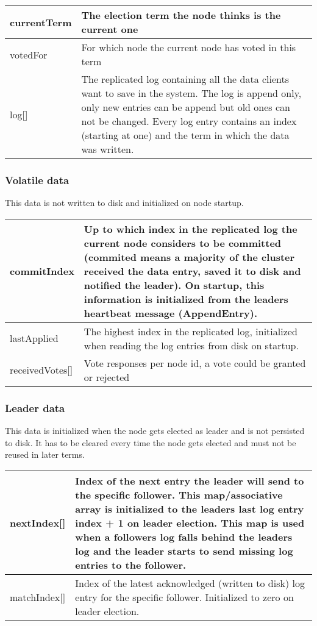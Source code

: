 \begin{tabular}{ | l | p{13.7cm} | }
\hline
currentTerm & The election term the node thinks is the current one \\ \hline
votedFor & For which node the current node has voted in this term \\ \hline
log[] & The replicated log containing all the data clients want to save in the system. The log is append only, only new entries can be append but old ones can not be changed.
Every log entry contains an index (starting at one) and the term in which the data was written. \\ \hline
\end{tabular}

\subsubsection*{Volatile data}

This data is not written to disk and initialized on node startup.

\begin{tabularx}{\textwidth}{  | p{80px} | X | }
\hline
commitIndex & Up to which index in the replicated log the current node considers to be committed (commited means a majority of the cluster
received the data entry, saved it to disk and notified the leader). On startup, this information is initialized from the leaders heartbeat message (AppendEntry). \\
\hline
lastApplied & The highest index in the replicated log, initialized when reading the log entries from disk on startup. \\
\hline
receivedVotes[] & Vote responses per node id, a vote could be granted or rejected \\
\hline
\end{tabularx}

\subsubsection*{Leader data}

This data is initialized when the node gets elected as leader and is not persisted to disk.
It has to be cleared every time the node gets elected and must not be reused in later terms.

\begin{tabular}{ | l | p{13.7cm} | }
\hline
nextIndex[] & Index of the next entry the leader will send to the specific follower. This map/associative array is initialized to the leaders last log entry index + 1 on leader election.
This map is used when a followers log falls behind the leaders log and the leader starts to send missing log entries to the follower. \\ \hline
matchIndex[] & Index of the latest acknowledged (written to disk) log entry for the specific follower. Initialized to zero on leader election. \\ \hline
\end{tabular}

